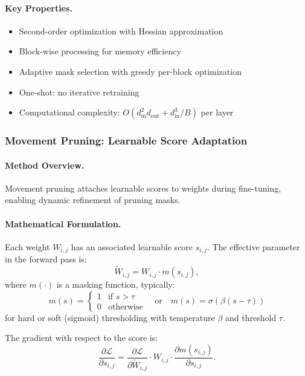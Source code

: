 \paragraph{Key Properties.}
\begin{itemize}[nosep]
	\item Second-order optimization with Hessian approximation
	\item Block-wise processing for memory efficiency
	\item Adaptive mask selection with greedy per-block optimization
	\item One-shot: no iterative retraining
	\item Computational complexity: $O(d_{\text{in}}^2 d_{\text{out}} + d_{\text{in}}^3 / B)$ per layer
\end{itemize}

\subsubsection{Movement Pruning: Learnable Score Adaptation}

\paragraph{Method Overview.} Movement pruning \cite{sanh2020movement} attaches learnable scores to weights during fine-tuning, enabling dynamic refinement of pruning masks.

\paragraph{Mathematical Formulation.}
Each weight $W_{i,j}$ has an associated learnable score $s_{i,j}$. The effective parameter in the forward pass is:
\begin{equation}
	\widetilde{W}_{i,j} = W_{i,j} \cdot m(s_{i,j}),
\end{equation}
where $m(\cdot)$ is a masking function, typically:
\begin{equation}
	m(s) = \begin{cases}
		1 & \text{if } s > \tau \\
		0 & \text{otherwise}
	\end{cases} \quad \text{or} \quad m(s) = \sigma(\beta(s - \tau))
\end{equation}
for hard or soft (sigmoid) thresholding with temperature $\beta$ and threshold $\tau$.

The gradient with respect to the score is:
\begin{equation}
	\frac{\partial \mathcal{L}}{\partial s_{i,j}}
	=
	\frac{\partial \mathcal{L}}{\partial \widetilde{W}_{i,j}}
	\cdot
	W_{i,j}
	\cdot
	\frac{\partial m(s_{i,j})}{\partial s_{i,j}}.
	\label{eq:movement-grad}
\end{equation}

